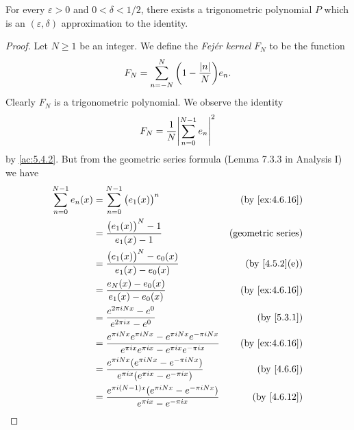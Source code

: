 \begin{lem}\label{5.4.6}
  For every \(\varepsilon > 0\) and \(0 < \delta < 1 / 2\), there exists a trigonometric polynomial \(P\) which is an \((\varepsilon, \delta)\) approximation to the identity.
\end{lem}

\begin{proof}
  Let \(N \geq 1\) be an integer.
  We define the \emph{Fejér kernel} \(F_N\) to be the function
  \[
    F_N = \sum_{n = -N}^N \bigg(1 - \frac{\left\lvert n\right\rvert}{N}\bigg) e_n.
  \]
  Clearly \(F_N\) is a trigonometric polynomial.
  We observe the identity
  \[
    F_N = \frac{1}{N} \abs{\sum_{n = 0}^{N - 1} e_n}^2
  \]
  by \cref{ac:5.4.2}.
  But from the geometric series formula (Lemma 7.3.3 in Analysis I) we have
  \begin{align*}
    \sum_{n = 0}^{N - 1} e_n(x) & = \sum_{n = 0}^{N - 1} \big(e_1(x)\big)^n                                                                               & \text{(by \cref{ex:4.6.16})} \\
                                & = \frac{\big(e_1(x)\big)^N - 1}{e_1(x) - 1}                                                                             & \text{(geometric series)}    \\
                                & = \frac{\big(e_1(x)\big)^N - e_0(x)}{e_1(x) - e_0(x)}                                                                   & \text{(by \cref{4.5.2}(e))}  \\
                                & = \frac{e_N(x) - e_0(x)}{e_1(x) - e_0(x)}                                                                               & \text{(by \cref{ex:4.6.16})} \\
                                & = \frac{e^{2 \pi i N x} - e^0}{e^{2 \pi i x} - e^0}                                                                     & \text{(by \cref{5.3.1})}     \\
                                & = \frac{e^{\pi i N x} e^{\pi i N x} - e^{\pi i N x} e^{-\pi i N x}}{e^{\pi i x} e^{\pi i x} - e^{\pi i x} e^{-\pi i x}} & \text{(by \cref{ex:4.6.16})} \\
                                & = \frac{e^{\pi i N x} (e^{\pi i N x} - e^{-\pi i N x})}{e^{\pi i x} (e^{\pi i x} - e^{-\pi i x})}                       & \text{(by \cref{4.6.6})}     \\
                                & = \frac{e^{\pi i (N - 1) x} (e^{\pi i N x} - e^{-\pi i N x})}{e^{\pi i x} - e^{-\pi i x}}                               & \text{(by \cref{4.6.12})}    \\

\end{align*}
\end{proof}
